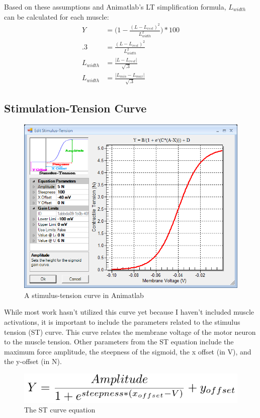 \documentclass[runningheads,a4paper]{llncs}
\begin{document}
		Based on these assumptions and Animatlab's LT simplification formula, $L_{width}$ can be calculated for each muscle:
			\begin{align*}
				Y &= \big(1-\frac{(L-L_{rest})^2}{L_{width}^2}\big)*100 \\
				.3 &= \frac{(L-L_{rest})^2}{L_{width}^2} \\
				L_{width} &= \frac{|L-L_{rest}|}{\sqrt{.3}} \\
			 L_{width} &= \frac{|L_{min}-L_{max}|}{\sqrt{.3}}
			\end{align*}
	\subsection{Stimulation-Tension Curve}
			\begin{figure}
				\centering
				\includegraphics[width=.8\textwidth]{st2.PNG}
				\caption{A stimulus-tension curve in Animatlab}
				\label{fig:STanim}
			\end{figure}
		While most work hasn't utilized this curve yet because I haven't included muscle activations, it is important to include the parameters related to the stimulus tension (ST) curve. This curve relates the membrane voltage of the motor neuron to the muscle tension. Other parameters from the ST equation include the maximum force amplitude, the steepness of the sigmoid, the x offset (in V), and the y-offset (in N).
			\begin{figure}
				\centering
				\includegraphics[width=.45\textwidth]{st1.PNG}
				\caption{The ST curve equation}
				\label{fig:STeqn}
			\end{figure}
\end{document}
